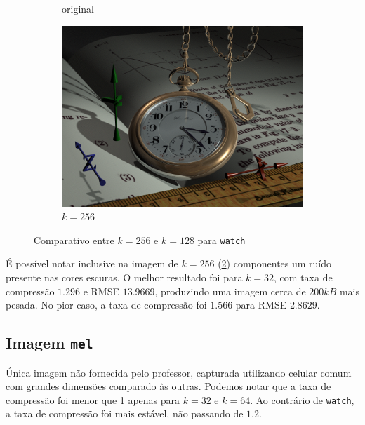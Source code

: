 \documentclass[brazilian,a4paper,twocolumn]{article}
\begin{document}
\begin{figure}[h]
\begin{subfigure}{0.27\textwidth}
                \caption{original}
                \label{fig:watch-original}
            \end{subfigure}
            \begin{subfigure}{0.27\textwidth}
                \includegraphics[width=\textwidth,keepaspectratio]{watch-256}
                \caption{$k=256$}
                \label{fig:watch-256}
            \end{subfigure}

            \caption{Comparativo entre $k=256$ e $k=128$ para \texttt{watch}}
            \label{fig:comparativo-watch}
        \end{figure}

        É possível notar inclusive na imagem de $k=256$ (\cref{fig:watch-256}) componentes um ruído presente nas cores escuras. O melhor resultado foi para $k=32$, com taxa de compressão $1.296$ e RMSE $13.9669$, produzindo uma imagem cerca de $200kB$ mais pesada. No pior caso, a taxa de compressão foi $1.566$ para RMSE $2.8629$.

    \subsection{Imagem \texttt{mel}}

        Única imagem não fornecida pelo professor, capturada utilizando celular comum com grandes dimensões comparado às outras. Podemos notar que a taxa de compressão foi menor que 1 apenas para $k=32$ e $k=64$. Ao contrário de \texttt{watch}, a taxa de compressão foi mais estável, não passando de $1.2$.
\end{document}
